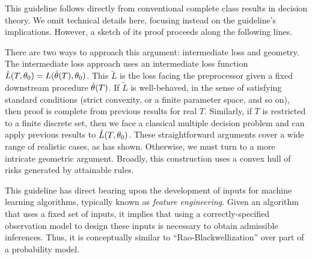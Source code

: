 This guideline follows directly from conventional complete class results in decision theory.
We omit technical details here, focusing instead on the guideline's implications.
However, a sketch of its proof proceeds along the following lines.

There are two ways to approach this argument: intermediate loss and geometry.
The intermediate loss approach uses an intermediate loss function $\tilde{L}(T, \theta_0) = L(\hat{\theta}(T), \theta_0)$.
This $\tilde{L}$ is the loss facing the preprocessor given a fixed downstream procedure $\hat{\theta}(T)$.
If $\tilde{L}$ is well-behaved, in the sense of satisfying standard conditions (strict convexity, or a finite parameter space, and so on), then proof is complete from previous results for real $T$.
Similarly, if $T$ is restricted to a finite discrete set, then we face a classical multiple decision problem and can apply previous results to $\tilde{L}(T, \theta_0)$.
These straightforward arguments cover a wide range of realistic cases, as \cite{Berger1985} has shown.
Otherwise, we must turn to a more intricate geometric argument.
Broadly, this construction uses a convex hull of risks generated by attainable rules.

This guideline has direct bearing upon the development of inputs for machine learning algorithms, typically known as \emph{feature engineering}.
Given an algorithm that uses a fixed set of inputs, it implies that using a correctly-specified observation model to design these inputs is necessary to obtain admissible inferences.
Thus, it is conceptually similar to ``Rao-Blackwellization'' over part of a probability model.


